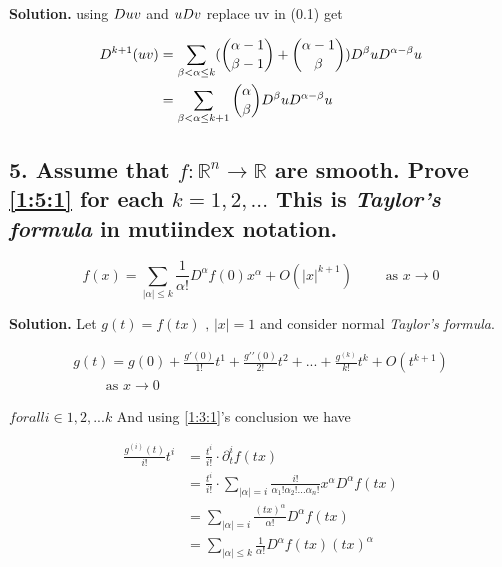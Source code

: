 \documentclass[a4paper]{book}
\newenvironment{solution}%
{\noindent\textbf{Solution.}}%
{\qedhere}
\numberwithin{equation}{chapter}
\theoremstyle{definition}
\begin{document}
\begin{multicols}{2}
\begin{solution}
	using $\mathnormal{D}uv$ and $u\mathnormal{D}v$ replace uv in (0.1) get
	
	\begin{equation}
	\begin{split}
	\mathnormal{D}^{k+1} (uv) &= \sum_{\beta < \alpha \leq k}^{}( \binom{\alpha -1}{\beta - 1} + \binom{\alpha -1}{\beta})
	\mathnormal{D}^\beta u \mathnormal{D}^{\alpha - \beta} u \\
	&= \sum_{\beta < \alpha \leq k+1}^{}\binom{\alpha}{\beta}
	\mathnormal{D}^\beta u \mathnormal{D}^{\alpha - \beta} u
	\end{split}
	\end{equation}
\end{solution}

\subsection{5. Assume that $f : \mathbb{R}^n \rightarrow \mathbb{R}$ are smooth. Prove \ref{1:5:1} for each $k = 1, 2,...$ This is \textit{Taylor's formula} in mutiindex notation. }

\begin{equation}\label{1:5:1}
	f(x) = \sum_{|\alpha| \leq k} \frac{1}{\alpha!} D^\alpha f(0) x^\alpha + O(|x|^{k+1}) \qquad \text{ as } x \rightarrow 0
\end{equation}

\begin{solution}
	Let $g(t) = f(tx) \text{ , } |x| = 1$ and consider normal \textit{Taylor's formula}.
	
	\begin{equation}\label{1:5:2}
	\begin{aligned}
		g(t) = g(0) + \frac{g\prime(0)}{1!}t^1 + \frac{g\prime\prime(0)}{2!}t^2 + ... + \frac{g^{(k)}}{k!}t^k + O(t^{k+1}) \\ 
		\qquad \text{ as } x \rightarrow 0
		\end{aligned}
	\end{equation}
	
	$forall i \in {1, 2, ... k}$ And using \ref{1:3:1}'s conclusion we have
	
	\begin{equation}\label{1:5:3}
		\begin{aligned}
		\frac{g^{(i)}(t)}{i!}t^i &= \frac{t^i}{i!} \cdot \partial_t^i f(tx) \\
		&=  \frac{t^i}{i!} \cdot \sum_{|\alpha| = i} \frac{i!}{\alpha_1 ! \alpha_2 ! ... \alpha_n !} x^\alpha D^\alpha f(tx)\\
		&= \sum_{|\alpha| = i} \frac{(tx)^\alpha}{\alpha!} D^\alpha f(tx) \\
		&= \sum_{|\alpha| \leq k} \frac{1}{\alpha!} D^\alpha f(tx) (tx)^\alpha
		\end{aligned}
	\end{equation}
	

\end{solution}
\end{multicols}
\end{document}
